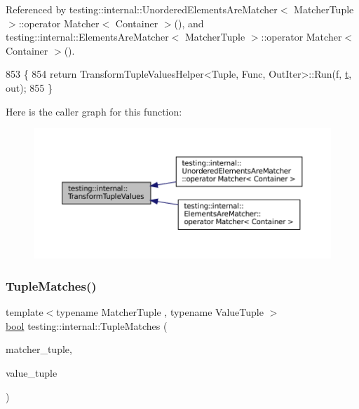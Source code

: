 Referenced by testing\+::internal\+::\+Unordered\+Elements\+Are\+Matcher$<$ Matcher\+Tuple $>$\+::operator Matcher$<$ Container $>$(), and testing\+::internal\+::\+Elements\+Are\+Matcher$<$ Matcher\+Tuple $>$\+::operator Matcher$<$ Container $>$().


\begin{DoxyCode}
853                                                                   \{
854   \textcolor{keywordflow}{return} TransformTupleValuesHelper<Tuple, Func, OutIter>::Run(f, \hyperlink{namespacebattery__monitor__node_a7a63d20d1ea461e280f4eb5b47f925cd}{t}, out);
855 \}
\end{DoxyCode}
Here is the caller graph for this function\+:
\nopagebreak
\begin{figure}[H]
\begin{center}
\leavevmode
\includegraphics[width=350pt]{namespacetesting_1_1internal_a07ba091a64aa2ba95e41accc55dc8855_icgraph}
\end{center}
\end{figure}
\mbox{\label{namespacetesting_1_1internal_a10095d1e1c99369200072b39d657ebc4}} 
\subsubsection{\texorpdfstring{Tuple\+Matches()}{TupleMatches()}}
{\footnotesize\ttfamily template$<$typename Matcher\+Tuple , typename Value\+Tuple $>$ \\
\hyperlink{classbool}{bool} testing\+::internal\+::\+Tuple\+Matches (\begin{DoxyParamCaption}\item[{const \hyperlink{structtesting_1_1internal_1_1MatcherTuple}{Matcher\+Tuple} \&}]{matcher\+\_\+tuple,  }\item[{const Value\+Tuple \&}]{value\+\_\+tuple }\end{DoxyParamCaption})}



